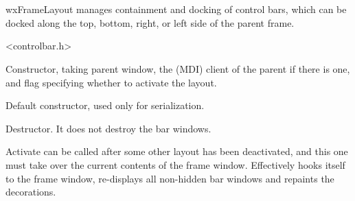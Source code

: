 %
%


\section{}\label{wxframelayout}


wxFrameLayout manages containment and docking of control bars,
which can be docked along the top, bottom, right, or left side of the
parent frame.




<controlbar.h>




\label{wxframelayoutwxframelayout}


Constructor, taking parent window, the (MDI) client of the parent if there
is one, and flag specifying whether to activate the layout.



Default constructor, used only for serialization.


\label{wxframelayoutdtor}


Destructor. It does not destroy the bar windows.


\label{wxframelayoutactivate}


Activate can be called after some other layout has been deactivated,
and this one must take over the current contents of the frame window.
Effectively hooks itself to the frame window, re-displays all non-hidden
bar windows and repaints the decorations.


\label{wxframelayoutaddbar}


